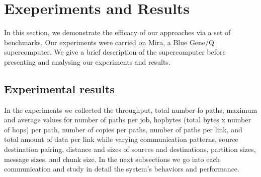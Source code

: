 \section{Exeperiments and Results}
\label{sec:benchmark}

In this section, we demonstrate the efficacy of our approaches via a set of benchmarks. Our experiments were carried on Mira, a Blue Gene/Q supercomputer. We give a brief description of the supercomputer before presenting and analysing our experiments and results.









\subsection{Experimental results}
\label{sec:results}

In the experiments we collected the throughput, total number fo paths, maximum and average values for number of paths per job, hopbytes (total bytes x number of hops) per path, number of copies per paths, number of paths per link, and total amount of data per link while varying communication patterns, source destination pairing, distance and sizes of sources and destinations, partition sizes, message sizes, and chunk size.
In the next subsections we go into each communication and study in detail the system's behaviors and performance.




















